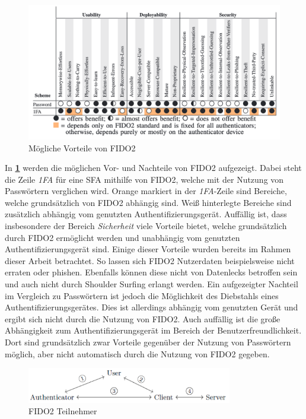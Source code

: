 \begin{figure}[h]
	\centering 
	\includegraphics[width=1\textwidth]{img/abbildungen/fido2_usability.png}
	\captionsetup{format=hang}
	\caption{Mögliche Vorteile von FIDO2 \cite{lyastani2020fido2}} \label{fido2-pros}
\end{figure}

In \textbf{\ref{fido2-pros}} werden die möglichen Vor- und Nachteile von \ac{FIDO}2 aufgezeigt. Dabei steht die Zeile \textit{1FA} für eine \ac{SFA} mithilfe von \ac{FIDO}2, welche mit der Nutzung von Passwörtern verglichen wird. Orange markiert in der \textit{1FA}-Zeile sind Bereiche, welche grundsätzlich von \ac{FIDO}2 abhängig sind. Weiß hinterlegte Bereiche sind zusätzlich abhängig vom genutzten Authentifizierungsgerät. Auffällig ist, dass insbesondere der Bereich \textit{Sicherheit} viele Vorteile bietet, welche grundsätzlich durch \ac{FIDO}2 ermöglicht werden und unabhängig vom genutzten Authentifizierungsgerät sind. Einige dieser Vorteile wurden bereits im Rahmen dieser Arbeit betrachtet. So lassen sich \ac{FIDO}2 Nutzerdaten beispielsweise nicht erraten oder phishen. Ebenfalls können diese nicht von Datenlecks betroffen sein und auch nicht durch Shoulder Surfing erlangt werden. Ein aufgezeigter Nachteil im Vergleich zu Passwörtern ist jedoch die Möglichkeit des Diebstahls eines Authentifizierungsgerätes. Dies ist allerdings abhängig vom genutzten Gerät und ergibt sich nicht durch die Nutzung von \ac{FIDO}2. Auch auffällig ist die große Abhängigkeit zum Authentifizierungsgerät im Bereich der Benutzerfreundlichkeit. Dort sind grundsätzlich zwar Vorteile gegenüber der Nutzung von Passwörtern möglich, aber nicht automatisch durch die Nutzung von \ac{FIDO}2 gegeben. 

\begin{figure}[h]
	\centering 
	\includegraphics[width=0.8\textwidth]{img/abbildungen/fido2_com.png}
	\captionsetup{format=hang}
	\caption{FIDO2 Teilnehmer \cite{barbosa2021provable}} \label{fido2-channels}
\end{figure}


